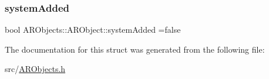 \mbox{\label{struct_a_r_objects_1_1_a_r_object_abb84b8f934ab23b396cc1904ba5c5569}} 
\subsubsection{\texorpdfstring{system\+Added}{systemAdded}}
{\footnotesize\ttfamily bool A\+R\+Objects\+::\+A\+R\+Object\+::system\+Added =false}



The documentation for this struct was generated from the following file\+:\begin{DoxyCompactItemize}
\item 
src/\mbox{\hyperlink{_a_r_objects_8h}{A\+R\+Objects.\+h}}\end{DoxyCompactItemize}
